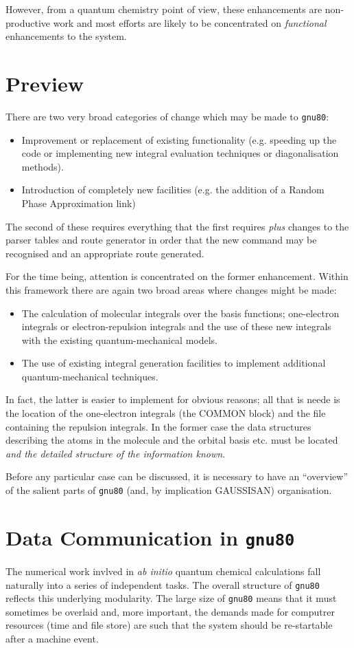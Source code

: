 However, from a quantum chemistry point of view, these enhancements
are non-productive work and most efforts are likely to be concentrated
on {\em functional} enhancements to the system.
\section{\sf Preview}
There are two very broad categories of change which may be
made to {\tt gnu80}:
\begin{itemize}
\item Improvement or replacement of existing functionality (e.g.
speeding up the code or implementing new integral evaluation techniques
or diagonalisation methods).
\item Introduction of completely new facilities (e.g. the addition
of a Random Phase Approximation link)
\end{itemize}
The second of these requires everything that the first requires
{\em plus} changes to the parser tables and route generator
in order that the
new command may be recognised and an appropriate route generated.

For the time being, attention is concentrated on the former enhancement.
Within this framework there are again two broad areas where changes might
be made:
\begin{itemize}
\item The calculation of molecular integrals over the basis functions;
one-electron integrals or electron-repulsion integrals and the use of
these new integrals with the existing quantum-mechanical models.
\item The use of existing integral generation facilities to implement
additional quantum-mechanical techniques.
\end{itemize}
In fact, the latter is easier to implement for obvious
reasons; all that is neede is the location of the one-electron
integrals (the COMMON block) and the file containing the repulsion integrals.
In the former case the data structures describing the atoms in the molecule
and the orbital basis etc. must be located {\em and the detailed
structure of the information known}.

Before any particular case can be discussed, it is necessary to
have an ``overview'' of the salient parts of {\tt gnu80}
(and, by implication GAUSSISAN) organisation.
\section{\sf Data Communication in {\tt gnu80}}
The numerical work invlved in {\em ab initio} quantum chemical
calculations fall naturally into a series of independent tasks.
The overall structure of {\tt gnu80} reflects this underlying
modularity. The large size of {\tt gnu80} means that it must
sometimes be overlaid and, more important, the demands made
for computrer resources (time and file store) are such that the
system should be re-startable after a machine event.

